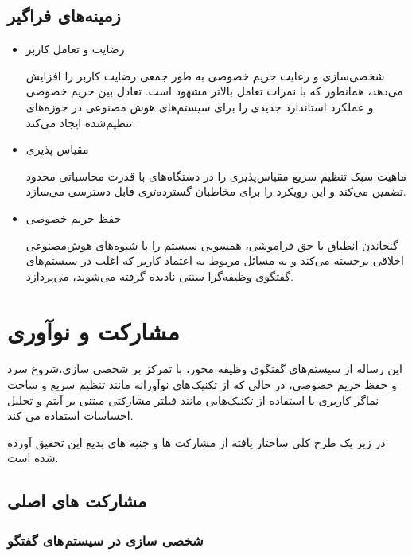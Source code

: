 \subsection{زمینه‌های فراگیر}

\begin{itemize}
\item
رضایت و تعامل کاربر

 شخصی‌سازی و رعایت حریم خصوصی به طور جمعی رضایت کاربر را افزایش می‌دهد، همانطور که با نمرات تعامل بالاتر مشهود است.
 تعادل بین حریم خصوصی و عملکرد استاندارد جدیدی را برای سیستم‌های هوش مصنوعی در حوزه‌های تنظیم‌شده ایجاد می‌کند.
\item
مقیاس پذیری

ماهیت سبک تنظیم سریع مقیاس‌پذیری را در دستگاه‌های با قدرت محاسباتی محدود تضمین می‌کند و این رویکرد را برای مخاطبان گسترده‌تری قابل دسترسی می‌سازد.
\item
حفظ حریم خصوصی

گنجاندن انطباق با حق فراموشی، همسویی سیستم را با شیوه‌های هوش‌مصنوعی اخلاقی برجسته می‌کند و به مسائل مربوط به اعتماد کاربر که اغلب در سیستم‌های گفتگوی وظیفه‌گرا سنتی نادیده گرفته می‌شوند، می‌پردازد.
\end{itemize}

\section{مشارکت و نوآوری}
این رساله از سیستم‌های گفتگوی وظیفه محور، با تمرکز بر شخصی سازی،شروع سرد و حفظ حریم خصوصی، در حالی که از تکنیک های نوآورانه مانند تنظیم سریع و ساخت نماگر کاربری با استفاده از تکنیک‌هایی مانند فیلتر مشارکتی مبتنی بر آیتم و تحلیل احساسات استفاده می کند.

در زیر یک طرح کلی ساختار یافته از مشارکت ها و جنبه های بدیع این تحقیق آورده شده است.

\subsection{مشارکت های اصلی}
\subsubsection{شخصی سازی در سیستم های گفتگو}


